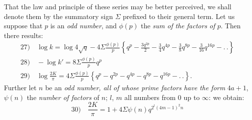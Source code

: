 \documentclass{article}
\begin{document}
That the law and principle of these series may be better perceived, we shall denote them by the summatory sign $\Sigma$ prefixed to their general term. Let us suppose that $p$ is an \emph{odd number}, and $\phi(p)$ the \emph{sum of the factors of} $p$. Then there results:
\[
\begin{gathered}
\text{27)}\quad\log k=\log4\sqrt{q}-4\Sigma\frac{\phi(p)}{p}\left\{q^{p}-\frac{3q^{2p}}{2}-\frac{3}{4}q^{4p}-\frac{3}{8}q^{8p}-\frac{3}{16}q^{16p}-.\,.\right\}\\[2ex]
\text{28)}\quad-\log k'=8\Sigma\frac{\phi(p)}{p}q^{p}\\[2ex]
\text{29)}\quad\log\frac{2K}{\pi}=4\Sigma\frac{\phi(p)}{p}\left\{q^{p}-q^{2p}-q^{4p}-q^{8p}-q^{16p}-.\,.\right\}.
\end{gathered}
\]
Further let $n$ be an \emph{odd number, all of whose prime factors have the form} $4a+1$, $\psi(n)$ the \emph{number of factors} of $n$; $l$, $m$ all numbers from $0$ up to $\infty$: we obtain:
\[
\text{30)}\quad\frac{2K}{\pi}=1+4\Sigma\psi(n)q^{2^{l}(4m-1)^{2}n}
\]
\end{document}
